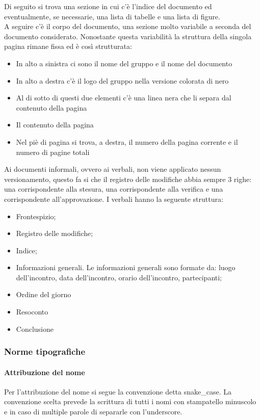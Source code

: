 \documentclass[../norme_di_progetto.tex]{subfiles}
\begin{document}
Di seguito si trova una sezione in cui c'è l'indice del documento ed eventualmente, se necessarie, una lista di tabelle e una lista di figure.\\
A seguire c'è il corpo del documento, una sezione molto variabile a seconda del documento considerato. Nonostante questa variabilità la struttura della singola pagina rimane fissa ed è così strutturata:
\begin{itemize}
    \item In alto a sinistra ci sono il nome del gruppo e il nome del documento
    \item In alto a destra c'è il logo del gruppo nella versione colorata di nero
    \item Al di sotto di questi due elementi c'è una linea nera che li separa dal contenuto della pagina
    \item Il contenuto della pagina 
    \item Nel piè di pagina si trova, a destra, il numero della pagina corrente e il numero di pagine totali
\end{itemize}
Ai documenti informali, ovvero ai verbali, non viene applicato nessun versionamento, questo fa si che il registro delle modifiche abbia sempre 3 righe: una corrispondente alla stesura, una corrispondente alla verifica e una corrispondente all'approvazione. I verbali hanno la seguente struttura:
\begin{itemize}
    \item Frontespizio;
    \item Registro delle modifiche;
    \item Indice;
    \item Informazioni generali. Le informazioni generali sono formate da: luogo dell'incontro, data dell'incontro, orario dell'incontro, partecipanti;
    \item Ordine del giorno
    \item Resoconto
    \item Conclusione
\end{itemize}

\subsubsection{Norme tipografiche}

\paragraph{Attribuzione del nome}
Per l'attribuzione del nome si segue la convenzione detta snake\_case. La convenzione scelta prevede la scrittura di tutti i nomi con stampatello minuscolo e in caso di multiple parole di separarle con l'underscore.
\end{document}
